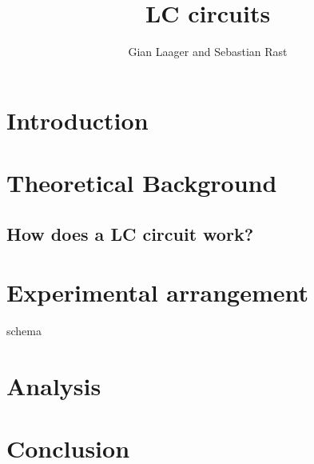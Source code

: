 \documentclass{article}
\title{LC circuits}
\author{Gian Laager and Sebastian Rast}
\begin{document}
\maketitle

\section{Introduction}

\section{Theoretical Background}
\subsection{How does a LC circuit work?}

\section{Experimental arrangement}
schema

\section{Analysis}

\section{Conclusion}



\end{document}
